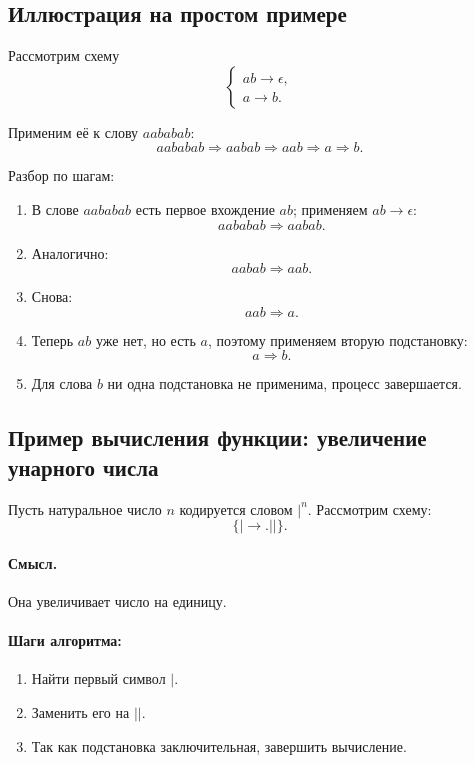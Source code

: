 \documentclass[12pt,a4paper]{article}
\begin{document}
\subsection{Иллюстрация на простом примере}
Рассмотрим схему
\[
\left\{
\begin{array}{l}
ab\to \epsilon,\\
a\to b.
\end{array}
\right.
\]

Применим её к слову $aababab$:
\[
aababab \Rightarrow aabab \Rightarrow aab \Rightarrow a \Rightarrow b.
\]

Разбор по шагам:
\begin{enumerate}
    \item В слове $aababab$ есть первое вхождение $ab$; применяем $ab\to \epsilon$:
    \[
    aababab \Rightarrow aabab.
    \]
    \item Аналогично:
    \[
    aabab \Rightarrow aab.
    \]
    \item Снова:
    \[
    aab \Rightarrow a.
    \]
    \item Теперь $ab$ уже нет, но есть $a$, поэтому применяем вторую подстановку:
    \[
    a \Rightarrow b.
    \]
    \item Для слова $b$ ни одна подстановка не применима, процесс завершается.
\end{enumerate}

\subsection{Пример вычисления функции: увеличение унарного числа}
Пусть натуральное число $n$ кодируется словом $|^n$. Рассмотрим схему:
\[
\{| \to. ||\}.
\]

\paragraph{Смысл.} Она увеличивает число на единицу.

\paragraph{Шаги алгоритма:}
\begin{enumerate}
    \item Найти первый символ $|$.
    \item Заменить его на $||$.
    \item Так как подстановка заключительная, завершить вычисление.
\end{enumerate}
\end{document}
